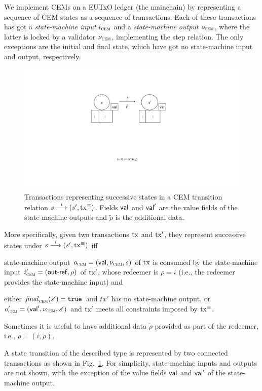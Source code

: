 We implement CEMs on a EUTxO ledger (the mainchain) by representing a sequence of CEM states as a sequence of transactions. Each of these transactions has got a \emph{state-machine input} $i_{\textsc{cem}}$ and a \emph{state-machine output} $o_{\textsc{cem}}$, where the latter is locked by a validator $\nu_{\textsc{cem}}$, implementing the step relation. The only exceptions are the initial and final state, which have got no state-machine input and output, respectively.

\begin{figure}[t]
  \centering
  \includegraphics[scale=.2,width=\textwidth/2]{figures/state-transition_cropped.pdf}
  \caption{Transactions representing successive states in a CEM
    transition relation \({s}\overset{i}\longrightarrow(s', \mathrm{tx}^\equiv)\).  Fields
    $\mathsf{val}$ and $\mathsf{val}'$ are the value fields of the state-machine
    outputs and $\tilde \rho$ is the additional data.}
  \label{fig:state-transition}
\end{figure}

More specifically, given two transactions $\mathrm{tx}$ and $\mathrm{tx}'$, they represent successive states under \({s}\overset{i}\longrightarrow(s', \mathrm{tx}^\equiv)\) iff 

\begin{mitemize}
  \item state-machine output $o_{\textsc{cem}} = (\mathsf{val}, \nu_{\textsc{cem}}, s)$ of $\mathrm{tx}$
  is consumed by the state-machine input $i_{\textsc{cem}}' = (\mathsf{out\textsf{-}{}ref}, \rho)$
  of $\mathrm{tx}'$, whose redeemer is \(\rho = i\) (i.e., the redeemer
  provides the state-machine input) and
  \item either $\mathit{final}_{\textsc{cem}}(s') = \mathtt{true}$ and $tx'$ has no state-machine
  output, or $o_{\textsc{cem}}' = (\mathsf{val}', \nu_{\textsc{cem}}, s')$ and $\mathrm{tx}'$ meets all
  constraints imposed by $\mathrm{tx}^\equiv$.
\end{mitemize}
Sometimes it is useful to have additional data $\tilde \rho$ provided
as part of the redeemer, i.e., $\rho = (i,\tilde \rho)$.

A state transition of the described type is represented by two connected
transactions as shown in Fig.~\ref{fig:state-transition}.  For
simplicity, state-machine inputs and outputs are not shown, with the
exception of the value fields $\mathsf{val}$ and $\mathsf{val}'$ of the state-machine output.


